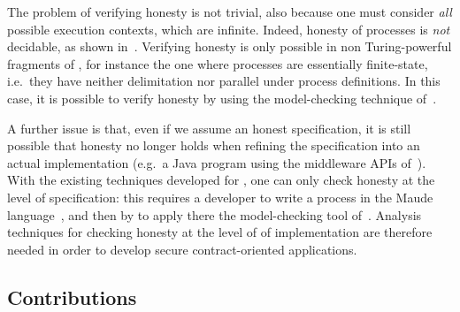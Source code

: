 The problem of verifying honesty is not trivial, 
also because one must consider \emph{all} possible execution contexts, 
which are infinite. %
Indeed, honesty of \coco processes is \emph{not} decidable, as shown 
in~\cite{Bartoletti15wsfm}. %
Verifying honesty is only possible in non Turing-powerful fragments of \coco,
for instance the one where processes are essentially finite-state,
i.e.\ they have neither delimitation nor parallel under process definitions. %
In this case, it is possible to verify honesty 
by using the model-checking technique of~\cite{verifiable}. %

A further issue is that, 
even if we assume an honest \coco specification, 
it is still possible that honesty no longer holds 
when refining the specification into an actual implementation 
(e.g.\ a Java program using the middleware APIs of~\cite{CO2}). %
%
With the existing techniques developed for \coco, 
one can only check honesty at the level of specification:
this requires a developer to
write a \coco process in the Maude language~\cite{Maude01},
and then by to apply there the model-checking tool of~\cite{verifiable}. %
Analysis techniques for checking honesty at the level of of implementation
are therefore needed in order to develop secure contract-oriented applications.


\subsection*{Contributions}


